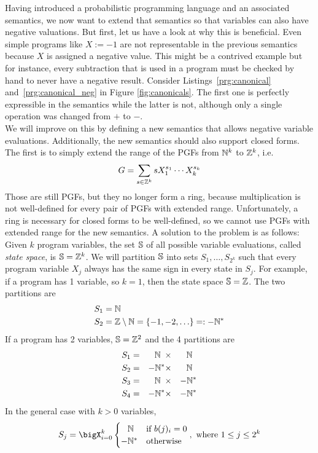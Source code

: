Having introduced a probabilistic programming language and an associated semantics, we now want to extend that semantics so that variables can also have negative valuations.
But first, let us have a look at why this is beneficial.
Even simple programs like $X := -1$ are not representable in the previous semantics because $X$ is assigned a negative value.
This might be a contrived example but for instance, every subtraction that is used in a program must be checked by hand to never have a negative result.
Consider Listings~\ref{prg:canonical} and~\ref{prg:canonical_neg} in Figure \ref{fig:canonicals}.
The first one is perfectly expressible in the semantics while the latter is not, although only a single operation was changed from $+$ to $-$. \\
We will improve on this by defining a new semantics that allows negative variable evaluations.
Additionally, the new semantics should also support closed forms.
The first is to simply extend the range of the PGFs from $\N^k$ to $\Z^k$, i.e.
\[ G = \sum_{s \in \Z^k} s X_1^{s_1} \cdots X_k^{s_k} \]
Those are still PGFs, but they no longer form a ring, because multiplication is not well-defined for every pair of PGFs with extended range.
Unfortunately, a ring is necessary for closed forms to be well-defined, so we cannot use PGFs with extended range for the new semantics.
A solution to the problem is as follows:
Given $k$ program variables, the set $\S$ of all possible variable evaluations, called \emph{state space}, is $\S = \Z^k$.
We will partition $\S$ into sets $S_1, \ldots, S_{2^k}$ such that every program variable $X_j$ always has the same sign in every state in $S_j$.
For example, if a program has 1 variable, so $k = 1$, then the state space $\S = \Z$.
The two partitions are 
\begin{align*}
	S_1 &= \N \\
	S_2 &= \Z \setminus \N = \{ -1, -2, \ldots \} =: -\N^*
\end{align*}
If a program has 2 variables, $\S = \Z^2$ and the 4 partitions are
\begin{alignat*}{5}
	S_1 = &&  \N \phantom{*}	\times &&  \N \phantom{*}	\\
	S_2 = && -\N^*				\times &&  \N \phantom{*}	\\
	S_3 = &&  \N \phantom{*}	\times && -\N^*				\\
	S_4 = && -\N^*				\times && -\N^*
\end{alignat*}
In the general case with $k > 0$ variables,
\[ S_j = \bigtimes_{i=0}^k
	\begin{cases}
		\phantom{-} \N & \text{if } b(j)_i = 0 \\
		-\N^* & \text{otherwise}
	\end{cases}
   \where 1 \leq j \leq 2^k \]
